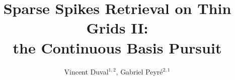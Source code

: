 \documentclass[11pt]{iopart}
\begin{document}
\title[Sparse Spikes Retrieval on Thin Grids II: the Continuous Basis Pursuit]{Sparse Spikes Retrieval on Thin Grids II:\\ the Continuous Basis Pursuit}


\author{Vincent Duval$^{1,2}$, Gabriel Peyr{\'e}$^{2,1}$}
\address{$^1$ INRIA, MOKAPLAN}
\address{$^2$ CNRS and CEREMADE, Universit\'e Paris-Dauphine}














\appendix





%
%
\printbibliography
\end{document}
